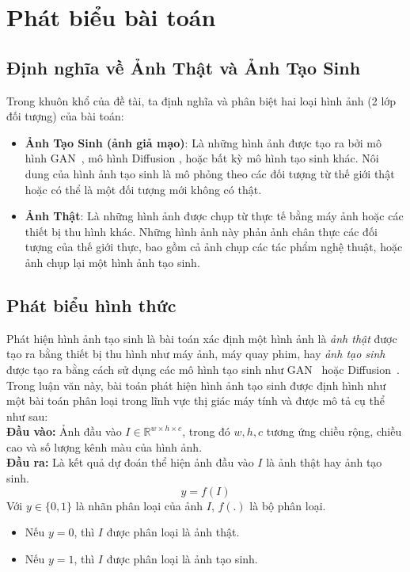 \section{Phát biểu bài toán}
%
\subsection{Định nghĩa về Ảnh Thật và Ảnh Tạo Sinh}
Trong khuôn khổ của đề tài, ta định nghĩa và phân biệt hai loại hình ảnh (2 lớp đối tượng) của bài toán:
\begin{itemize}  

    \item \textbf{Ảnh Tạo Sinh (ảnh giả mạo)}: Là những hình ảnh được tạo ra bởi mô hình GAN~\cite{Goodfellow2014GenerativeAN}, mô hình Diffusion \cite{Ho2020DenoisingDP}, hoặc bất kỳ mô hình tạo sinh khác. Nôi dung của hình ảnh tạo sinh là mô phỏng theo các đối tượng từ thế giới thật hoặc có thể là một đối tượng mới không có thật.
    
    \item \textbf{Ảnh Thật}: Là những hình ảnh được chụp từ thực tế bằng máy ảnh hoặc các thiết bị thu hình khác. Những hình ảnh này phản ảnh chân thực các đối tượng của thế giới thực, bao gồm cả ảnh chụp các tác phẩm nghệ thuật, hoặc ảnh chụp lại một hình ảnh tạo sinh.

\end{itemize}
%
\subsection{Phát biểu hình thức}
%
Phát hiện hình ảnh tạo sinh là bài toán xác định một hình ảnh là \textit{ảnh thật} được tạo ra bằng thiết bị thu hình như máy ảnh, máy quay phim, hay \textit{ảnh tạo sinh} được tạo ra bằng cách sử dụng các mô hình tạo sinh như GAN~\cite{Goodfellow2014GenerativeAN} hoặc Diffusion~\cite{Ho2020DenoisingDP}. Trong luận văn này, bài toán phát hiện hình ảnh tạo sinh được định hình như một bài toán phân loại trong lĩnh vực thị giác máy tính và được mô tả cụ thể như sau:\\
%
\textbf{Đầu vào:} Ảnh đầu vào $I \in \mathbb{R}^{w \times h \times c}$, trong đó $w ,h, c$ tương ứng chiều rộng, chiều cao và số lượng kênh màu của hình ảnh.\\
%
\textbf{Đầu ra: } Là kết quả dự đoán thể hiện ảnh đầu vào $I$ là ảnh thật hay ảnh tạo sinh.
\begin{equation}
y = f(I)
\end{equation}
Với  \( y \in \{0, 1\} \) là nhãn phân loại của ảnh \( I \), $f(.)$ là bộ phân loại.
\begin{itemize}
    \item Nếu \( y = 0 \), thì \( I \) được phân loại là ảnh thật.
    \item Nếu \( y = 1 \), thì \( I \) được phân loại là ảnh tạo sinh.
\end{itemize}
%
%
